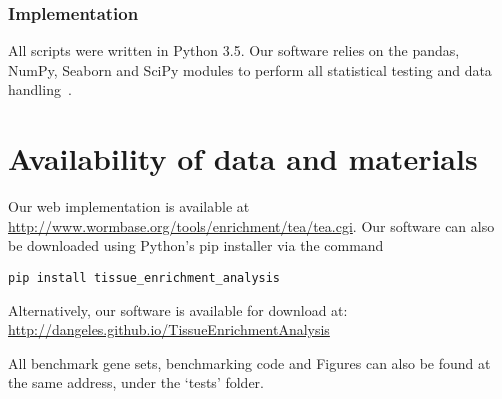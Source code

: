 \documentclass{bmcart}
\begin{document}
\subsubsection*{Implementation}
All scripts were written in Python 3.5. Our software relies on the pandas, NumPy, Seaborn and SciPy modules to perform all statistical testing and data handling~\cite{McKinney2011, VanDerWalt2011, Oliphant2007}.


\section*{Availability of data and materials}
Our web implementation is available at \url{http://www.wormbase.org/tools/enrichment/tea/tea.cgi}. Our software can also be downloaded using Python's pip installer via the command

\texttt{pip install tissue\_enrichment\_analysis}

Alternatively, our software is available for download at: \url{http://dangeles.github.io/TissueEnrichmentAnalysis}

All benchmark gene sets, benchmarking code and Figures can also be found at the same address, under the `tests' folder.
\end{document}
